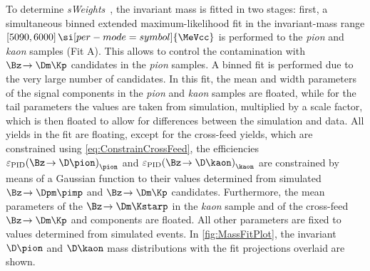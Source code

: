 To determine \emph{sWeights}~\cite{Pivk:2004ty}, the invariant \Bz mass is fitted in two stages:
first, a simultaneous binned extended maximum-likelihood fit in the invariant-mass range $[5090, 6000]\,\si[per-mode=symbol]{\MeVcc}$ is performed to the \emph{pion} and \emph{kaon} samples (Fit A).
This allows to control the contamination with $\Bz\!\to\Dm\Kp$ candidates in the \emph{pion} samples.
A binned fit is performed due to the very large number of candidates.
In this fit, the mean and width parameters of the signal components in the \emph{pion} and \emph{kaon} samples are floated, while for the tail parameters the values are taken from simulation, multiplied by a scale factor, which is then floated to allow for differences between the simulation and data.
All yields in the fit are floating, except for the cross-feed yields, which are constrained using \cref{eq:ConstrainCrossFeed}, \ie the efficiencies $\varepsilon_{\text{PID}}\!\left(\Bz\!\to\D \pion\right)_{\pion}$ and $\varepsilon_{\text{PID}}\!\left(\Bz\!\to\D \kaon\right)_{\kaon}$ are constrained by means of a Gaussian function to their values determined from simulated $\Bz\!\to\Dpm\pimp$ and $\Bz\!\to\Dm\Kp$ candidates.
Furthermore, the mean parameters of the $\Bz\!\to\Dm\Kstarp$ in the \emph{kaon} sample and of the cross-feed $\Bz\!\to\Dm\Kp$ and \BdToDpi components are floated.
All other parameters are fixed to values determined from simulated events.
In \cref{fig:MassFitPlot}, the invariant $\D\pion$  and $\D\kaon$ mass distributions with the fit projections overlaid are shown.
